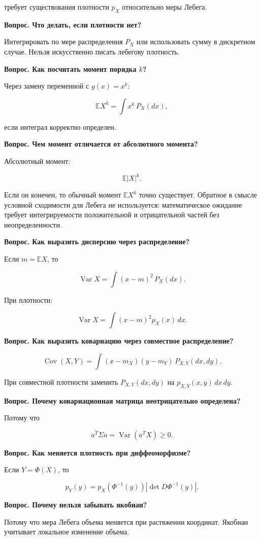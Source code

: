\documentclass[
  11pt,
  a4paper,
]{article}
\begin{document}
требует существования плотности \(p_X\) относительно меры Лебега.

\textbf{Вопрос. Что делать, если плотности нет?}

Интегрировать по мере распределения \(P_X\) или использовать сумму в
дискретном случае. Нельзя искусственно писать лебегову плотность.

\textbf{Вопрос. Как посчитать момент порядка \(k\)?}

Через замену переменной с \(g(x)=x^k\):

\[
\mathbb EX^k=\int x^k\,P_X(dx),
\]

если интеграл корректно определен.

\textbf{Вопрос. Чем момент отличается от абсолютного момента?}

Абсолютный момент:

\[
\mathbb E|X|^k.
\]

Если он конечен, то обычный момент \(\mathbb EX^k\) точно существует.
Обратное в смысле условной сходимости для Лебега не используется:
математическое ожидание требует интегрируемости положительной и
отрицательной частей без неопределенности.

\textbf{Вопрос. Как выразить дисперсию через распределение?}

Если \(m=\mathbb EX\), то

\[
\operatorname{Var}X=\int (x-m)^2\,P_X(dx).
\]

При плотности:

\[
\operatorname{Var}X=\int (x-m)^2p_X(x)\,dx.
\]

\textbf{Вопрос. Как выразить ковариацию через совместное распределение?}

\[
\operatorname{Cov}(X,Y)
=
\int (x-m_X)(y-m_Y)\,P_{X,Y}(dx,dy).
\]

При совместной плотности заменить \(P_{X,Y}(dx,dy)\) на
\(p_{X,Y}(x,y)\,dx\,dy\).

\textbf{Вопрос. Почему ковариационная матрица неотрицательно
определена?}

Потому что

\[
a^T\Sigma a=\operatorname{Var}(a^TX)\ge0.
\]

\textbf{Вопрос. Как меняется плотность при диффеоморфизме?}

Если \(Y=\Phi(X)\), то

\[
p_Y(y)=p_X(\Phi^{-1}(y))
\left|\det D\Phi^{-1}(y)\right|.
\]

\textbf{Вопрос. Почему нельзя забывать якобиан?}

Потому что мера Лебега объема меняется при растяжении координат. Якобиан
учитывает локальное изменение объема.
\end{document}
